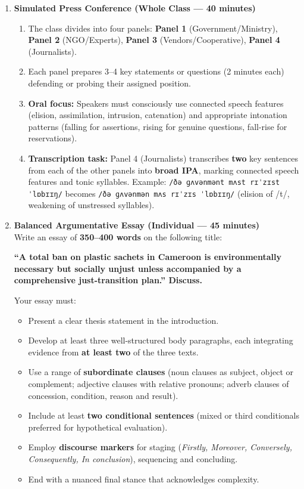 \documentclass[11pt]{article}
\begin{document}
\begin{enumerate}
    \item \textbf{Simulated Press Conference (Whole Class --- 40 minutes)} \\
    \begin{enumerate}
        \item The class divides into four panels: \textbf{Panel 1} (Government/Ministry), \textbf{Panel 2} (NGO/Experts), \textbf{Panel 3} (Vendors/Cooperative), \textbf{Panel 4} (Journalists).
        \item Each panel prepares 3--4 key statements or questions (2 minutes each) defending or probing their assigned position.
        \item \textbf{Oral focus:} Speakers must consciously use connected speech features (elision, assimilation, intrusion, catenation) and appropriate intonation patterns (falling for assertions, rising for genuine questions, fall-rise for reservations).
        \item \textbf{Transcription task:} Panel 4 (Journalists) transcribes \textbf{two} key sentences from each of the other panels into \textbf{broad IPA}, marking connected speech features and tonic syllables. Example: \texttt{/ðə ɡʌvənmənt mʌst rɪˈzɪst ˈlɒbɪɪŋ/} becomes \texttt{/ðə ɡʌvənmən mʌs rɪˈzɪs ˈlɒbɪɪŋ/} (elision of /t/, weakening of unstressed syllables).
    \end{enumerate}

    \item \textbf{Balanced Argumentative Essay (Individual --- 45 minutes)} \\
    Write an essay of \textbf{350--400 words} on the following title:
    \begin{center}
    \textbf{``A total ban on plastic sachets in Cameroon is environmentally necessary but socially unjust unless accompanied by a comprehensive just-transition plan.'' Discuss.}
    \end{center}
    Your essay must:
    \begin{itemize}
        \item Present a clear thesis statement in the introduction.
        \item Develop at least three well-structured body paragraphs, each integrating evidence from \textbf{at least two} of the three texts.
        \item Use a range of \textbf{subordinate clauses} (noun clauses as subject, object or complement; adjective clauses with relative pronouns; adverb clauses of concession, condition, reason and result).
        \item Include at least \textbf{two conditional sentences} (mixed or third conditionals preferred for hypothetical evaluation).
        \item Employ \textbf{discourse markers} for staging (\textit{Firstly, Moreover, Conversely, Consequently, In conclusion}), sequencing and concluding.
        \item End with a nuanced final stance that acknowledges complexity.
    \end{itemize}


\end{enumerate}
\end{document}
